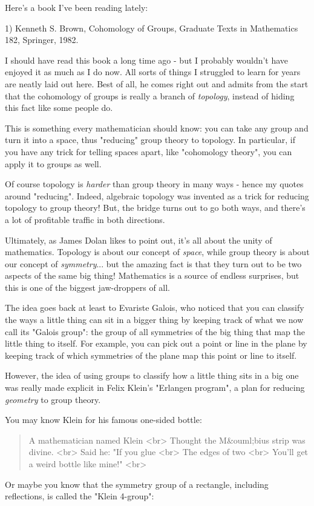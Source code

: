 


Here's a book I've been reading lately:

1) Kenneth S. Brown, Cohomology of Groups, Graduate Texts in Mathematics 
182, Springer, 1982.

I should have read this book a long time ago - but I probably wouldn't
have enjoyed it as much as I do now.  All sorts of things I struggled 
to learn for years are neatly laid out here.  Best of all, he comes
right out and admits from the start that the cohomology of groups is
really a branch of \emph{topology}, instead of hiding this fact like some
people do.  

This is something every mathematician should know: you can take any 
group and turn it into a space, thus "reducing" group theory 
to topology.
In particular, if you have any trick for telling spaces apart, like
"cohomology theory", you can apply it to groups as well.

Of course topology is \emph{harder} than group theory in many ways - hence
my quotes around "reducing".  Indeed, algebraic topology was invented
as a trick for reducing topology to group theory!  But, the bridge 
turns out to go both ways, and there's a lot of profitable traffic in 
both directions. 

Ultimately, as James Dolan likes to point out, it's all about the unity of 
mathematics.  Topology is about our concept of \emph{space}, 
while group theory 
is about our concept of \emph{symmetry}... 
but the amazing fact is that they turn 
out to be two aspects of the same big thing!  Mathematics is a source of 
endless surprises, but this is one of the biggest jaw-droppers of all.  

The idea goes back at least to Evariste Galois, who noticed that you can 
classify the ways a little thing can sit in a bigger thing by keeping track 
of what we now call its "Galois group": the group of all 
symmetries of the 
big thing that map the little thing to itself.  For example, you can pick 
out a point or line in the plane by keeping track of which symmetries of 
the plane map this point or line to itself.  

However, the idea of using groups to classify how a little thing sits
in a big one was really made explicit in Felix Klein's 
"Erlangen program", 
a plan for reducing \emph{geometry} to group theory.  

You may know Klein for his famous one-sided bottle:

\begin{quote}
            A mathematician named Klein <br>
            Thought the M&ouml;bius strip was divine. <br>
            Said he: "If you glue <br>
            The edges of two <br>
            You'll get a weird bottle like mine!" <br>

\end{quote}
Or maybe you know that the symmetry group of a rectangle, including 
reflections, is called the "Klein 4-group":


